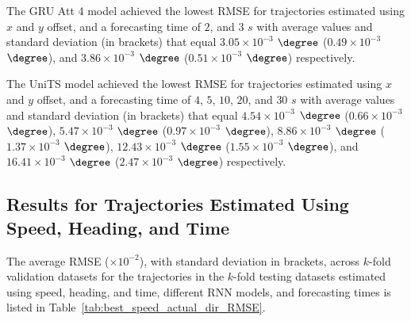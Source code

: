 The GRU Att 4 model achieved the lowest RMSE for trajectories estimated using $x$ and $y$ offset, and a forecasting time of $2$, and $3$ $s$ with average values and standard deviation (in brackets) that equal $3.05 \times 10^{-3}$ $\degree$ ($0.49 \times 10^{-3}$ $\degree$), and $3.86 \times 10^{-3}$ $\degree$ ($0.51 \times 10^{-3}$ $\degree$) respectively.

The UniTS model achieved the lowest RMSE for trajectories estimated using $x$ and $y$ offset, and a forecasting time of $4$, $5$, $10$, $20$, and $30$ $s$ with average values and standard deviation (in brackets) that equal $4.54 \times 10^{-3}$ $\degree$ ($0.66 \times 10^{-3}$ $\degree$), $5.47 \times 10^{-3}$ $\degree$ ($0.97 \times 10^{-3}$ $\degree$), $8.86 \times 10^{-3}$ $\degree$ ($1.37 \times 10^{-3}$ $\degree$), $12.43 \times 10^{-3}$ $\degree$ ($1.55 \times 10^{-3}$ $\degree$), and $16.41 \times 10^{-3}$ $\degree$ ($2.47 \times 10^{-3}$ $\degree$) respectively.

\subsection{Results for Trajectories Estimated Using Speed, Heading, and Time}

The average RMSE ($\times 10^{-2}$), with standard deviation in brackets, across $k$-fold validation datasets for the trajectories in the $k$-fold testing datasets estimated using speed, heading, and time, different RNN models, and forecasting times is listed in Table~\ref{tab:best_speed_actual_dir_RMSE}.

